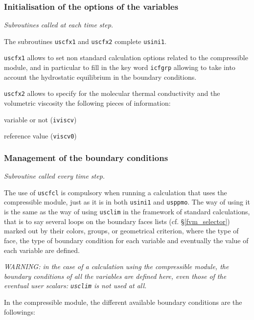 {{{%
\subsubsection{ Initialisation of the options of the variables}
\label{prg_uscfx12}%
\noindent
\textit{Subroutines called at each time step.}

The subroutines \texttt{uscfx1} and \texttt{uscfx2} complete \texttt{usini1}.

\texttt{uscfx1} allows to set non standard calculation options related to the
compressible module, and in particular to fill in the key word \texttt{icfgrp}
allowing to take into account the hydrostatic equilibrium in the
boundary conditions.

\texttt{uscfx2} allows to specify for the molecular thermal conductivity and
the volumetric viscosity the following pieces of information:
\begin{list}{-}{}
  \item variable or not (\texttt{iviscv})
  \item reference value (\texttt{viscv0})
\end{list}

\subsubsection{Management of the boundary conditions}

\noindent
\textit{Subroutine called every time step.}

The use of \texttt{uscfcl}
is compulsory when running a calculation that uses the compressible module, just
as it is in both \texttt{usini1} and \texttt{usppmo}. The
way of using it is the same as the way of using
\texttt{usclim} in the framework of standard calculations, that is to
say several loops on the boundary faces lists (cf. \S\ref{fvm_selector})
marked out by their colors, groups, or  geometrical criterion, where
the type of face, the type of boundary condition for each variable and
eventually the value of each variable are defined.

{\em WARNING: in the case of a calculation using the compressible
module, the boundary conditions of all the variables are defined here,
even those of the eventual user scalars: {\em \texttt{usclim}} is not
used at all.}

In the compressible module, the different available boundary conditions
are the followings:

}}}
